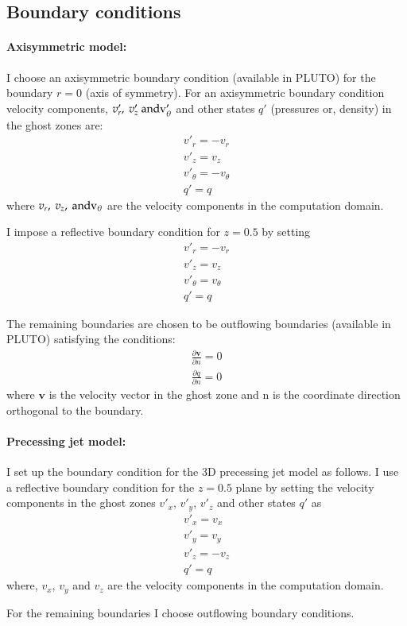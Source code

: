 \subsection{Boundary conditions}
\paragraph{Axisymmetric model:}
I choose an axisymmetric boundary condition (available in PLUTO) for the boundary $r=0$ (axis of symmetry). For an axisymmetric boundary condition velocity components, $v'_r, \ v'_z \ \rm and v'_{\theta}$ and other states $q'$ (pressures or, density) in the ghost zones are:
\begin{eqnarray}
v'_r = -v_r  \\
v'_z = v_z \\
v'_{\theta} = -v_{\theta}  \\
q' = q
\end{eqnarray}
where $v_r, \ v_z, \ \rm and v_{\theta}$ are the velocity components in the computation domain. 

I impose a reflective boundary condition for $z=0.5$ by setting 
\begin{eqnarray}
v'_r = -v_r  \\
v'_z = v_z \\
v'_{\theta} = v_{\theta}  \\
q' = q
\end{eqnarray}

The remaining boundaries are chosen to be outflowing boundaries (available in PLUTO) satisfying the conditions: 
\begin{eqnarray}
\frac{\partial\textbf{v}}{\partial n}= 0 \\
\frac{\partial q}{\partial n}= 0
\end{eqnarray}
where $\textbf{v}$ is the velocity vector in the ghost zone and n is the coordinate direction orthogonal to the boundary. 

\paragraph{Precessing jet model:} 
I set up the boundary condition for the 3D precessing jet model as follows. I use a reflective boundary condition for the $z = 0.5$ plane by setting the velocity components in the ghost zones $v'_x$,  $v'_y$, $v'_z$ and other states $q'$ as 
\begin{eqnarray}
v'_x = v_x  \\
v'_y = v_y \\
v'_z = -v_z  \\
q' = q
\end{eqnarray}
where, $v_x$, $v_y$ and $v_z$ are the velocity components in the computation domain. 

For the remaining boundaries I choose outflowing boundary conditions. 

